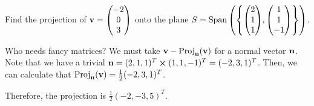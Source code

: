 \documentclass{agony}
\begin{document}
\begin{prob}
  Find the projection of $\vb v = \mqty(-2\\0\\3)$
  onto the plane $S = \Span\qty(\qty{\mqty(2\\1\\1),\mqty(1\\1\\-1)})$.
\end{prob}
\begin{sol}
  Who needs fancy matrices?
  We must take $\vb v - \operatorname{Proj}_{\vb n}(\vb v)$ for a normal vector $\vb n$.
  Note that we have a trivial $\vb n = (2,1,1)^T \cp (1,1,-1)^T = (-2,3,1)^T$.
  Then, we can calculate that $\operatorname{Proj}_{\vb n}(\vb v) = \frac12(-2,3,1)^T$.

  Therefore, the projection is $\frac12(-2,-3,5)^T$.
\end{sol}
\end{document}
